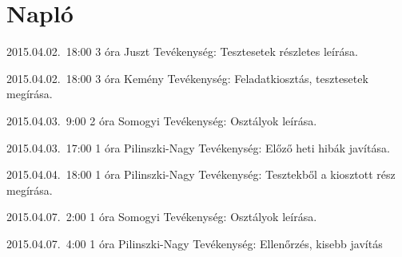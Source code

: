 %
\section{Napló}

\begin{naplo}
	
\bejegyzes
{2015.04.02.~18:00}
{3 óra}
{Juszt}
{Tevékenység: Tesztesetek részletes leírása.}

\bejegyzes
{2015.04.02.~18:00}
{3 óra}
{Kemény}
{Tevékenység: Feladatkiosztás, tesztesetek megírása.}

\bejegyzes
{2015.04.03.~9:00}
{2 óra}
{Somogyi}
{Tevékenység: Osztályok leírása.}

\bejegyzes
{2015.04.03.~17:00}
{1 óra}
{Pilinszki-Nagy}
{Tevékenység: Előző heti hibák javítása.}

\bejegyzes
{2015.04.04.~18:00}
{1 óra}
{Pilinszki-Nagy}
{Tevékenység: Tesztekből a kiosztott rész megírása.}

\bejegyzes
{2015.04.07.~2:00}
{1 óra}
{Somogyi}
{Tevékenység: Osztályok leírása.}

\bejegyzes
{2015.04.07.~4:00}
{1 óra}
{Pilinszki-Nagy}
{Tevékenység: Ellenőrzés, kisebb javítás}


\end{naplo}

